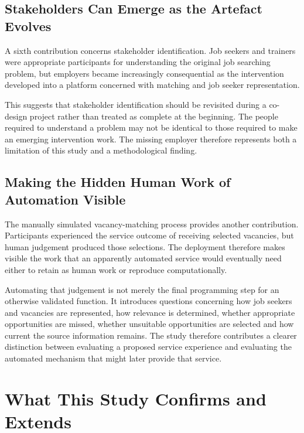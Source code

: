 \subsection{Stakeholders Can Emerge as the Artefact Evolves}

A sixth contribution concerns stakeholder identification. Job seekers and trainers were appropriate participants for understanding the original job searching problem, but employers became increasingly consequential as the intervention developed into a platform concerned with matching and job seeker representation.

This suggests that stakeholder identification should be revisited during a co-design project rather than treated as complete at the beginning. The people required to understand a problem may not be identical to those required to make an emerging intervention work. The missing employer therefore represents both a limitation of this study and a methodological finding.


\subsection{Making the Hidden Human Work of Automation Visible}

The manually simulated vacancy-matching process provides another contribution. Participants experienced the service outcome of receiving selected vacancies, but human judgement produced those selections. The deployment therefore makes visible the work that an apparently automated service would eventually need either to retain as human work or reproduce computationally.

Automating that judgement is not merely the final programming step for an otherwise validated function. It introduces questions concerning how job seekers and vacancies are represented, how relevance is determined, whether appropriate opportunities are missed, whether unsuitable opportunities are selected and how current the source information remains. The study therefore contributes a clearer distinction between evaluating a proposed service experience and evaluating the automated mechanism that might later provide that service.


\section{What This Study Confirms and Extends}

